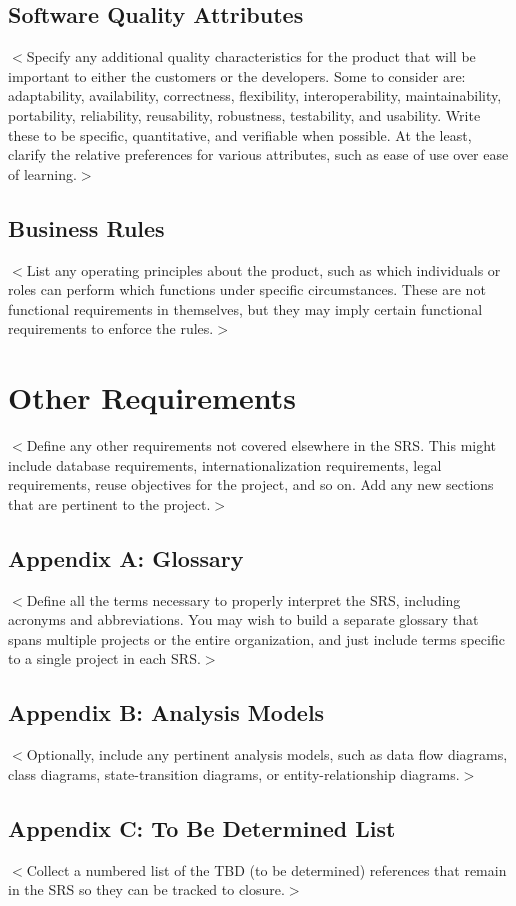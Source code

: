 \documentclass{scrreprt}
\begin{document}
\begin{CJK}{UTF8}{bkai}
\section{Software Quality Attributes}
$<$Specify any additional quality characteristics for the product that will be 
important to either the customers or the developers. Some to consider are: 
adaptability, availability, correctness, flexibility, interoperability, 
maintainability, portability, reliability, reusability, robustness, testability, 
and usability. Write these to be specific, quantitative, and verifiable when 
possible. At the least, clarify the relative preferences for various attributes, 
such as ease of use over ease of learning.$>$

\section{Business Rules}
$<$List any operating principles about the product, such as which individuals or 
roles can perform which functions under specific circumstances. These are not 
functional requirements in themselves, but they may imply certain functional 
requirements to enforce the rules.$>$


\chapter{Other Requirements}
$<$Define any other requirements not covered elsewhere in the SRS. This might 
include database requirements, internationalization requirements, legal 
requirements, reuse objectives for the project, and so on. Add any new sections 
that are pertinent to the project.$>$

\section{Appendix A: Glossary}
$<$Define all the terms necessary to properly interpret the SRS, including 
acronyms and abbreviations. You may wish to build a separate glossary that spans 
multiple projects or the entire organization, and just include terms specific to 
a single project in each SRS.$>$

\section{Appendix B: Analysis Models}
$<$Optionally, include any pertinent analysis models, such as data flow 
diagrams, class diagrams, state-transition diagrams, or entity-relationship 
diagrams.$>$

\section{Appendix C: To Be Determined List}
$<$Collect a numbered list of the TBD (to be determined) references that remain 
in the SRS so they can be tracked to closure.$>$
\end{CJK}
\end{document}
